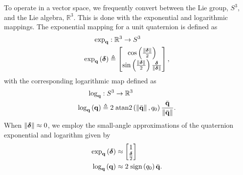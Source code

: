 To operate in a vector space, we frequently convert between the Lie group,
$S^3$, and the Lie algebra, $\mathbb{R}^3$.
This is done with the
exponential and logarithmic mappings. The exponential mapping for a unit quaternion is defined as
\begin{align}
\exp_{\boldsymbol{\mathrm{q}}} & :\mathbb{R}^{3}\rightarrow S^3\nonumber \\
\exp_{\boldsymbol{\mathrm{q}}}\left(\boldsymbol{\mathrm{\delta}}\right) & \triangleq\begin{bmatrix}\cos\left(\frac{\lVert\boldsymbol{\mathrm{\delta}}\rVert}{2}\right)\\
\sin\left(\frac{\lVert\boldsymbol{\mathrm{\delta}}\rVert}{2}\right)\frac{\boldsymbol{\mathrm{\delta}}}{\lVert\boldsymbol{\mathrm{\delta}}\rVert}
\end{bmatrix},\label{eqn:exponential_map}
\end{align}
with the corresponding logarithmic map defined as
\begin{align}
\log_{\boldsymbol{\mathrm{q}}} & :S^3\rightarrow \mathbb{R}^{3}\nonumber \\
\log_{\boldsymbol{\mathrm{q}}}\left(\boldsymbol{\mathrm{q}}\right) & \triangleq2\;\mathrm{atan2}\left(\left\Vert \bar{\boldsymbol{\mathrm{q}}}\right\Vert ,q_{0}\right)\frac{\bar{\boldsymbol{\mathrm{q}}}}{\left\Vert \bar{\boldsymbol{\mathrm{q}}}\right\Vert }.\label{eqn:log_map}
\end{align}
When $\left\Vert \boldsymbol{\mathrm{\delta}}\right\Vert\approx0$,
we employ the small-angle approximations of the quaternion exponential and
logarithm given by
\begin{align}
\exp_{\boldsymbol{\mathrm{q}}}\left(\boldsymbol{\mathrm{\delta}}\right) & \approx\begin{bmatrix}1\\
\frac{\boldsymbol{\mathrm{\delta}}}{2}
\end{bmatrix}\label{eq:quaternion_exp_approx}\\
\log_{\boldsymbol{\mathrm{q}}}\left(\boldsymbol{\mathrm{q}}\right) & \approx2\;\textrm{sign}\left(q_{0}\right)\bar{\boldsymbol{\mathrm{q}}}.\label{eq:quaternion_log_approx}
\end{align}



